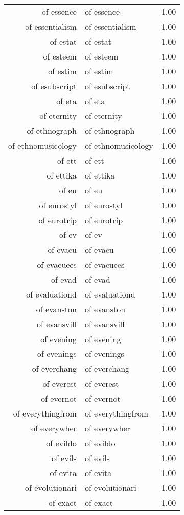 \begin{table}[ht]
\begin{tabular}{rlr}
  of essence & of essence & 1.00 \\ 
  of essentialism & of essentialism & 1.00 \\ 
  of estat & of estat & 1.00 \\ 
  of esteem & of esteem & 1.00 \\ 
  of estim & of estim & 1.00 \\ 
  of esubscript & of esubscript & 1.00 \\ 
  of eta & of eta & 1.00 \\ 
  of eternity & of eternity & 1.00 \\ 
  of ethnograph & of ethnograph & 1.00 \\ 
  of ethnomusicology & of ethnomusicology & 1.00 \\ 
  of ett & of ett & 1.00 \\ 
  of ettika & of ettika & 1.00 \\ 
  of eu & of eu & 1.00 \\ 
  of eurostyl & of eurostyl & 1.00 \\ 
  of eurotrip & of eurotrip & 1.00 \\ 
  of ev & of ev & 1.00 \\ 
  of evacu & of evacu & 1.00 \\ 
  of evacuees & of evacuees & 1.00 \\ 
  of evad & of evad & 1.00 \\ 
  of evaluationd & of evaluationd & 1.00 \\ 
  of evanston & of evanston & 1.00 \\ 
  of evansvill & of evansvill & 1.00 \\ 
  of evening & of evening & 1.00 \\ 
  of evenings & of evenings & 1.00 \\ 
  of everchang & of everchang & 1.00 \\ 
  of everest & of everest & 1.00 \\ 
  of evernot & of evernot & 1.00 \\ 
  of everythingfrom & of everythingfrom & 1.00 \\ 
  of everywher & of everywher & 1.00 \\ 
  of evildo & of evildo & 1.00 \\ 
  of evils & of evils & 1.00 \\ 
  of evita & of evita & 1.00 \\ 
  of evolutionari & of evolutionari & 1.00 \\ 
  of exact & of exact & 1.00 \\ 

\end{tabular}
\end{table}
